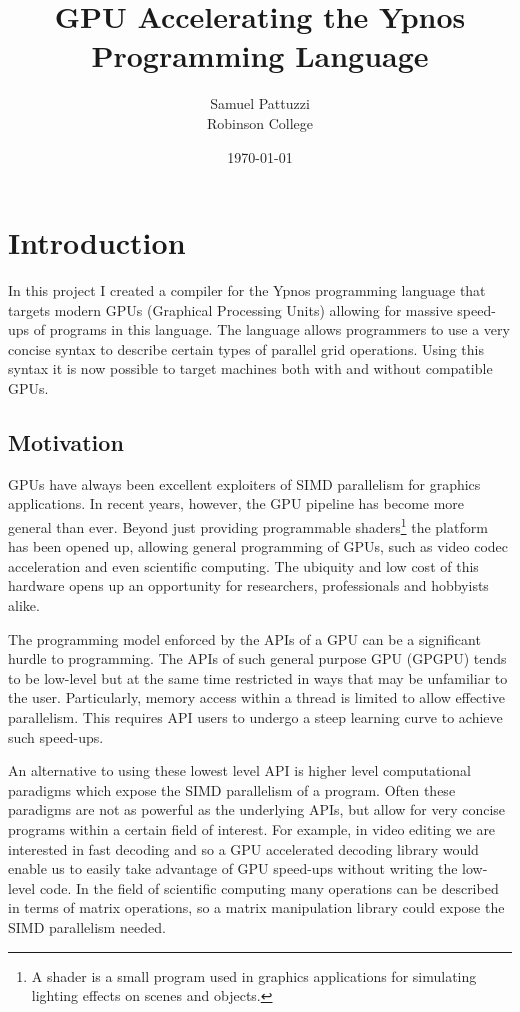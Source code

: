 \documentclass[12pt,a4paper,twoside]{scrbook}
\title{GPU Accelerating the Ypnos Programming Language}
\author{Samuel Pattuzzi\\ Robinson College}
\date{\today}
\begin{document}
\frontmatter





\mainmatter
\chapter{Introduction}

In this project I created a compiler for the Ypnos programming language that
targets modern GPUs (Graphical Processing Units) allowing for massive speed-ups of programs in this
language. The language allows programmers to use a very concise syntax to
describe certain types of parallel grid operations. Using this syntax it is now
possible to target machines both with and without compatible GPUs.

\section{Motivation}

GPUs have always been excellent exploiters of SIMD parallelism for graphics
applications. In recent years, however, the GPU pipeline has become more general
than ever. Beyond just providing programmable shaders\footnote{A shader is a
  small program used in graphics applications for simulating lighting effects on
  scenes and objects.} the platform has been opened up, allowing general
programming of GPUs, such as video codec acceleration and even scientific
computing. The ubiquity and low cost of this hardware opens up an opportunity
for researchers, professionals and hobbyists alike.

The programming model enforced by the APIs of a GPU can be a significant hurdle
to programming. The APIs of such general purpose GPU (GPGPU) tends to be
low-level but at the same time restricted in ways that may be unfamiliar to the
user. Particularly, memory access within a thread is limited to allow effective
parallelism. This requires API users to undergo a steep learning curve to
achieve such speed-ups.

An alternative to using these lowest level API is higher level computational
paradigms which expose the SIMD parallelism of a program. Often these paradigms
are not as powerful as the underlying APIs, but allow for very concise programs
within a certain field of interest. For example, in video editing we are
interested in fast decoding and so a GPU accelerated decoding library would
enable us to easily take advantage of GPU speed-ups without writing the
low-level code. In the field of scientific computing many operations can be
described in terms of matrix operations, so a matrix manipulation library could
expose the SIMD parallelism needed.
\end{document}
